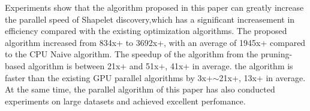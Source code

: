 \begin{eabstract}
Experiments show that the algorithm proposed in this paper can greatly increase the parallel speed of Shapelet discovery,which has a significant increasement in efficiency compared with the existing optimization algorithms. The proposed algorithm increased from 834x+ to 3692x+, with an average of 1945x+ compared to the CPU Naive algorithm. The speedup of the algorithm from the pruning-based algorithm is between 21x+ and 51x+, 41x+ in average. the algorithm is faster than the existing GPU parallel algorithms by 3x+$\sim$21x+, 13x+ in average. At the same time, the parallel algorithm of this paper has also conducted experiments on large datasets and achieved excellent perfomance.
	
\end{eabstract}

